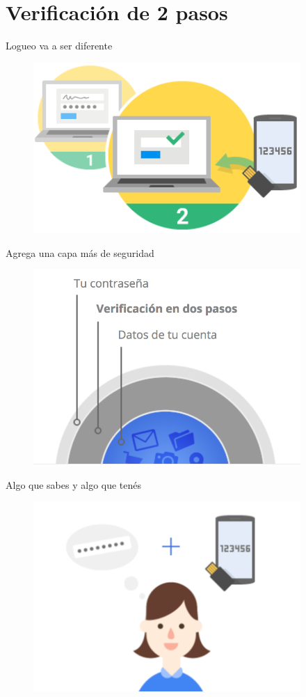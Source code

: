 \documentclass[11pt]{beamer}
\begin{document}
\section{Verificaci\'on de 2 pasos}
\begin{frame}{Logueo va a ser diferente}
  \begin{figure}
    \includegraphics[width=4in]{how-works-img-1.png}
  \end{figure}
\end{frame}
\begin{frame}{Agrega una capa m\'as de seguridad}
  \begin{figure}
    \includegraphics[width=4in]{unacapamas.png}
  \end{figure}
\end{frame}
\begin{frame}{Algo que sabes y algo que ten\'es}
  \begin{figure}
    \includegraphics[width=4in]{algoqsabesyalgoqtenes.png}
  \end{figure}
\end{frame}
\end{document}
